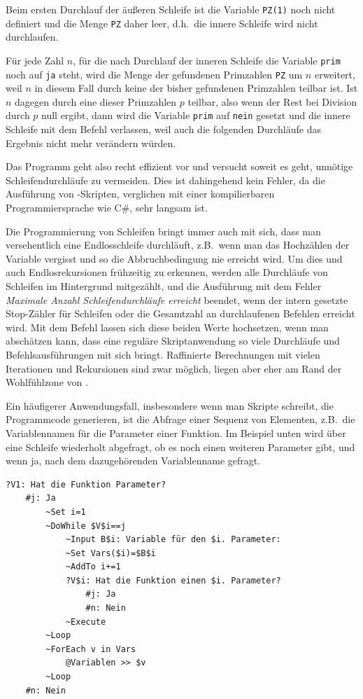 Beim ersten Durchlauf der äußeren Schleife ist die Variable \verb|PZ(1)| noch nicht definiert und die Menge \verb|PZ| daher leer, d.h.\ die innere Schleife wird nicht durchlaufen.

Für jede Zahl $n$, für die nach Durchlauf der inneren Schleife die Variable \verb|prim| noch auf \verb|ja| steht, wird die Menge der gefundenen Primzahlen \verb|PZ| um $n$ erweitert, weil $n$ in diesem Fall durch keine der bisher gefundenen Primzahlen teilbar ist. Ist $n$ dagegen durch eine dieser Primzahlen $p$ teilbar, also wenn der Rest bei Division durch $p$ null ergibt, dann wird die Variable \verb|prim| auf \verb|nein| gesetzt und die innere Schleife mit dem Befehl  verlassen, weil auch die folgenden Durchläufe das Ergebnis nicht mehr verändern würden.

Das Programm geht also recht effizient vor und versucht soweit es geht, unnötige Schleifendurchläufe zu vermeiden. Dies ist dahingehend kein Fehler, da die Ausführung von \FPZb-Skripten, verglichen mit einer kompilierbaren Programmiersprache wie C\#, sehr langsam ist.

Die Programmierung von Schleifen bringt immer auch mit sich, dass man versehentlich eine Endlosschleife durchläuft, z.B.\ wenn man das Hochzählen der Variable vergisst und so die Abbruchbedingung nie erreicht wird. Um dies und auch Endlosrekursionen frühzeitig zu erkennen, werden alle Durchläufe von Schleifen im Hintergrund mitgezählt, und die Ausführung mit dem Fehler \emph{Maximale Anzahl Schleifendurchläufe erreicht} beendet, wenn der intern gesetzte Stop-Zähler für Schleifen oder die Gesamtzahl an durchlaufenen Befehlen erreicht wird. Mit dem Befehl  lassen sich diese beiden Werte hochsetzen, wenn man abschätzen kann, dass eine reguläre Skriptanwendung so viele Durchläufe und Befehlsausführungen mit sich bringt. Raffinierte Berechnungen mit vielen Iterationen und Rekursionen sind zwar möglich, liegen aber eher am Rand der Wohlfühlzone von \FPZ.

Ein häufigerer Anwendungsfall, insbesondere wenn man Skripte schreibt, die Programmcode generieren, ist die Abfrage einer Sequenz von Elementen, z.B.\  die Variablennamen für die Parameter einer Funktion. Im Beispiel unten wird über eine Schleife wiederholt abgefragt, ob es noch einen weiteren Parameter gibt, und wenn ja, nach dem dazugehörenden Variablenname gefragt. 

\label{BspAbfrageschleife}
\begin{verbatim}
?V1: Hat die Funktion Parameter?
    #j: Ja
        ~Set i=1
        ~DoWhile $V$i==j
            ~Input B$i: Variable für den $i. Parameter:
            ~Set Vars($i)=$B$i
            ~AddTo i+=1
            ?V$i: Hat die Funktion einen $i. Parameter?
                #j: Ja            
                #n: Nein
            ~Execute
        ~Loop
        ~ForEach v in Vars
            @Variablen >> $v
        ~Loop
    #n: Nein
\end{verbatim}

